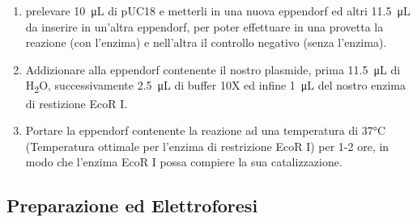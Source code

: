 \begin{enumerate}

	\item prelevare \SI{10}{\micro\liter} di pUC18 e metterli in una nuova eppendorf
	ed altri \SI{11.5}{\micro\liter} da inserire in un'altra eppendorf, per poter effettuare in
	una provetta la reazione (con l'enzima) e nell'altra il controllo negativo (senza l'enzima).

	\item Addizionare alla eppendorf contenente il nostro plasmide,
	prima \SI{11.5}{\micro\liter} di H\textsubscript{2}O, successivamente
	\SI{2.5}{\micro\liter} di buffer 10X ed infine \SI{1}{\micro\liter} del nostro enzima di restizione EcoR I.

	\item Portare la eppendorf contenente la reazione ad una temperatura di 37°C
	(Temperatura ottimale per l'enzima di restrizione EcoR I) per 1-2 ore,
	in modo che l'enzima EcoR I possa compiere la sua catalizzazione.

\end{enumerate}

\subsection{Preparazione ed Elettroforesi}


